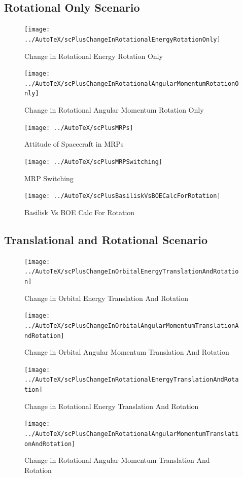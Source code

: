 \subsection{Rotational Only Scenario}
\begin{figure}[htbp]
	\centerline{
		\texttt{[image: ../AutoTeX/scPlusChangeInRotationalEnergyRotationOnly]}}
	\caption{Change in Rotational Energy Rotation Only}
	\label{fig:ChangeInRotationalEnergyRotationOnly}
\end{figure}
\begin{figure}[htbp]
	\centerline{
		\texttt{[image: ../AutoTeX/scPlusChangeInRotationalAngularMomentumRotationOnly]}}
	\caption{Change in Rotational Angular Momentum Rotation Only}
	\label{fig:ChangeInRotationalAngularMomentumRotationOnly}
\end{figure}
\begin{figure}[htbp]
	\centerline{
		\texttt{[image: ../AutoTeX/scPlusMRPs]}}
	\caption{Attitude of Spacecraft in MRPs}
	\label{fig:MRPs}
\end{figure}
\begin{figure}[htbp]
	\centerline{
		\texttt{[image: ../AutoTeX/scPlusMRPSwitching]}}
	\caption{MRP Switching}
	\label{fig:MRPSwitching}
\end{figure}
\begin{figure}[htbp]
	\centerline{
		\texttt{[image: ../AutoTeX/scPlusBasiliskVsBOECalcForRotation]}}
	\caption{Basilisk Vs BOE Calc For Rotation}
	\label{fig:BasiliskVsBOECalcForRotation}
\end{figure}
\clearpage

\subsection{Translational and Rotational Scenario}
\begin{figure}[htbp]
	\centerline{
		\texttt{[image: ../AutoTeX/scPlusChangeInOrbitalEnergyTranslationAndRotation]}}
	\caption{Change in Orbital Energy Translation And Rotation}
	\label{fig:ChangeInOrbitalEnergyTranslationAndRotation}
\end{figure}
\begin{figure}[htbp]
	\centerline{
		\texttt{[image: ../AutoTeX/scPlusChangeInOrbitalAngularMomentumTranslationAndRotation]}}
	\caption{Change in Orbital Angular Momentum Translation And Rotation}
	\label{fig:ChangeInOrbitalAngularMomentumTranslationAndRotation}
\end{figure}
\begin{figure}[htbp]
	\centerline{
		\texttt{[image: ../AutoTeX/scPlusChangeInRotationalEnergyTranslationAndRotation]}}
	\caption{Change in Rotational Energy Translation And Rotation}
	\label{fig:ChangeInRotationalEnergyTranslationAndRotation}
\end{figure}
\begin{figure}[htbp]
	\centerline{
		\texttt{[image: ../AutoTeX/scPlusChangeInRotationalAngularMomentumTranslationAndRotation]}}
	\caption{Change in Rotational Angular Momentum Translation And Rotation}
	\label{fig:ChangeInRotationalAngularMomentumTranslationAndRotation}
\end{figure}
\clearpage

